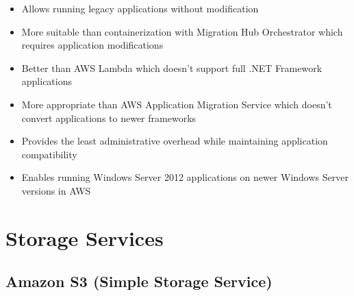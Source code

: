 \documentclass[11pt,a4paper]{report}
\begin{document}
\begin{itemize}
\begin{itemize}
\begin{itemize}
  \item Use an Amazon Machine Image (AMI) to deploy EC2 instances running Windows Server
\end{itemize}
  \item Allows running legacy applications without modification
  \item More suitable than containerization with Migration Hub Orchestrator which requires application modifications
  \item Better than AWS Lambda which doesn't support full .NET Framework applications
  \item More appropriate than AWS Application Migration Service which doesn't convert applications to newer frameworks
  \item Provides the least administrative overhead while maintaining application compatibility
  \item Enables running Windows Server 2012 applications on newer Windows Server versions in AWS
\end{itemize}
\end{itemize}



\chapter{Storage Services}



\section{Amazon S3 (Simple Storage Service)}
\end{document}
